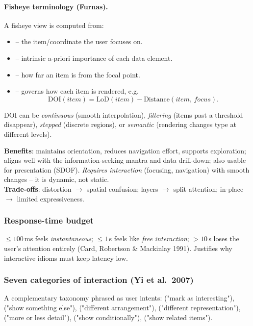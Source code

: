 \paragraph{Fisheye terminology (Furnas).} A fisheye view is computed from:
\begin{itemize}
  \item {} -- the item/coordinate the user focuses on.
  \item {} -- intrinsic a-priori importance of each data element.
  \item {} -- how far an item is from the focal point.
  \item {} -- governs how each item is rendered, e.g.
  \[
    \text{DOI}(item) = \text{LoD}(item) - \text{Distance}(item,\,focus).
  \]
\end{itemize}
DOI can be \emph{continuous} (smooth interpolation), \emph{filtering} (items past a threshold disappear), \emph{stepped} (discrete regions), or \emph{semantic} (rendering changes type at different levels).

\begin{keybox}
\textbf{Benefits}: maintains orientation, reduces navigation effort, supports exploration; aligns well with the information-seeking mantra and data drill-down; also usable for presentation (SDOF). \emph{Requires interaction} (focusing, navigation) with smooth changes -- it is dynamic, not static. \\
\textbf{Trade-offs}: distortion $\rightarrow$ spatial confusion; layers $\rightarrow$ split attention; in-place $\rightarrow$ limited expressiveness.
\end{keybox}

\subsubsection{Response-time budget}
$\le 100$\,ms feels \emph{instantaneous}; $\le 1$\,s feels like \emph{free interaction}; $> 10$\,s loses the user's attention entirely (Card, Robertson \& Mackinlay 1991). Justifies why interactive idioms must keep latency low.

\subsubsection{Seven categories of interaction (Yi et al.\ 2007)}
A complementary taxonomy phrased as user intents:  ("mark as interesting"),  ("show something else"),  ("different arrangement"),  ("different representation"),  ("more or less detail"),  ("show conditionally"),  ("show related items").

